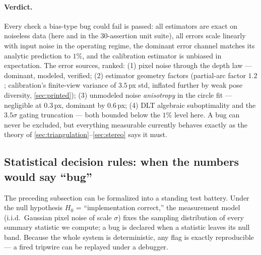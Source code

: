 \documentclass[11pt]{article}
\theoremstyle{definition}
\begin{document}
\paragraph{Verdict.} Every check a bias-type bug could fail is passed:
all estimators are exact on noiseless data (here and in the 30-assertion
unit suite), all errors scale linearly with input noise in the operating
regime, the dominant error channel matches its analytic prediction to
$1\%$, and the calibration estimator is unbiased in expectation. The
error sources, ranked: (1) pixel noise through the depth law ---
dominant, modeled, verified; (2) estimator geometry factors (partial-arc
factor $1.2$; calibration's finite-view variance of $3.5$\,px std,
inflated further by weak pose diversity, \autoref{sec:printed});
(3) unmodeled noise \emph{anisotropy} in the circle fit --- negligible at
$0.3$\,px, dominant by $0.6$\,px; (4) DLT algebraic suboptimality and the
$3.5\sigma$ gating truncation --- both bounded below the $1\%$ level
here. A bug can never be excluded, but everything measurable currently
behaves exactly as the theory of
\autoref{sec:triangulation}--\autoref{sec:stereo} says it must.

\subsection{Statistical decision rules: when the numbers would say ``bug''}
\label{sec:statrules}

The preceding subsection can be formalized into a standing test battery.
Under the null hypothesis $H_0$ = ``implementation correct,'' the
measurement model (i.i.d.\ Gaussian pixel noise of scale $\sigma$) fixes
the sampling distribution of every summary statistic we compute; a bug is
declared when a statistic leaves its null band. Because the whole system
is deterministic, any flag is exactly reproducible --- a fired tripwire
can be replayed under a debugger.
\end{document}
